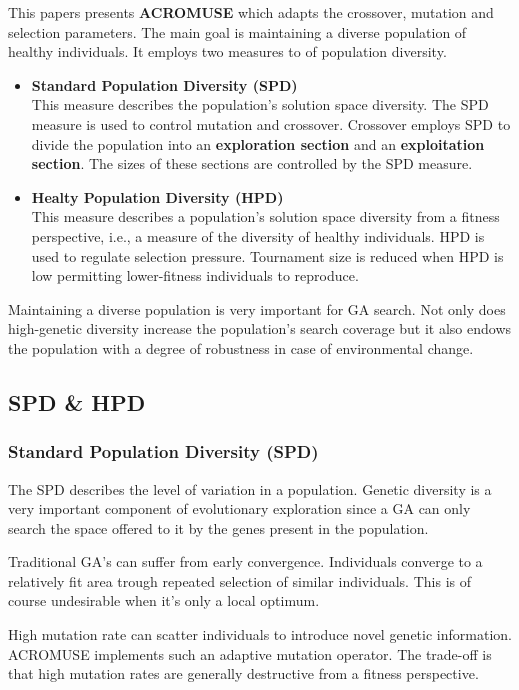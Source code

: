 \documentclass[../main.tex]{subfiles}
\begin{document}
This papers presents \textbf{ACROMUSE} which adapts the crossover, mutation and selection parameters. The main goal is maintaining a diverse population of healthy individuals. It employs two measures to of population diversity.

\begin{itemize}
	\item \textbf{Standard Population Diversity (SPD)} \\
	This measure describes the population's solution space diversity. The SPD measure is used to control mutation and crossover. Crossover employs SPD to divide the population into an \textbf{exploration section} and an \textbf{exploitation section}. The sizes of these sections are controlled by the SPD measure.
	\item \textbf{Healty Population Diversity (HPD)} \\
	This measure describes a population’s solution space diversity from a fitness perspective, i.e., a measure of the
	diversity of healthy individuals. HPD is used to regulate selection pressure. Tournament size is reduced when HPD is low permitting lower-fitness individuals to reproduce.
\end{itemize}

Maintaining a diverse population is very important for GA search. Not only does high-genetic diversity increase the
population's search coverage but it also endows the population with a degree of robustness in case of environmental change.

\subsection{SPD \& HPD}

\subsubsection{Standard Population Diversity (SPD)}
The SPD describes the level of variation in a population. Genetic diversity is a very important component of
evolutionary exploration since a GA can only search the space offered to it by the genes present in the population.

Traditional GA's can suffer from early convergence. Individuals converge to a relatively fit area trough repeated selection of similar individuals. This is of course undesirable when it's only a local optimum.

High mutation rate can scatter individuals to introduce novel genetic information. ACROMUSE implements such an adaptive mutation operator. The trade-off is that high mutation rates are generally destructive from a fitness perspective.
\end{document}
